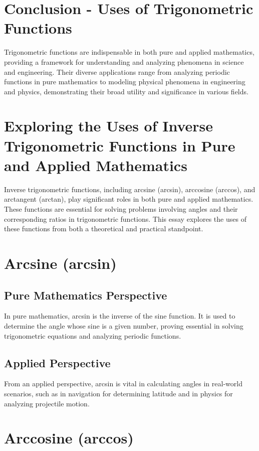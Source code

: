 \documentclass[a4paper,12pt]{book}
\newcounter{problem}
\begin{document}
\section*{Conclusion - Uses of Trigonometric Functions}
Trigonometric functions are indispensable in both pure and applied mathematics, providing a framework for understanding and analyzing phenomena in science and engineering. Their diverse applications range from analyzing periodic functions in pure mathematics to modeling physical phenomena in engineering and physics, demonstrating their broad utility and significance in various fields.



\section*{Exploring the Uses of Inverse Trigonometric Functions in Pure and Applied Mathematics}
Inverse trigonometric functions, including arcsine (arcsin), arccosine (arccos), and arctangent (arctan), play significant roles in both pure and applied mathematics. These functions are essential for solving problems involving angles and their corresponding ratios in trigonometric functions. This essay explores the uses of these functions from both a theoretical and practical standpoint.

\section*{Arcsine (arcsin)}
\subsection*{Pure Mathematics Perspective}
In pure mathematics, arcsin is the inverse of the sine function. It is used to determine the angle whose sine is a given number, proving essential in solving trigonometric equations and analyzing periodic functions.

\subsection*{Applied Perspective}
From an applied perspective, arcsin is vital in calculating angles in real-world scenarios, such as in navigation for determining latitude and in physics for analyzing projectile motion.

\section*{Arccosine (arccos)}
\end{document}
